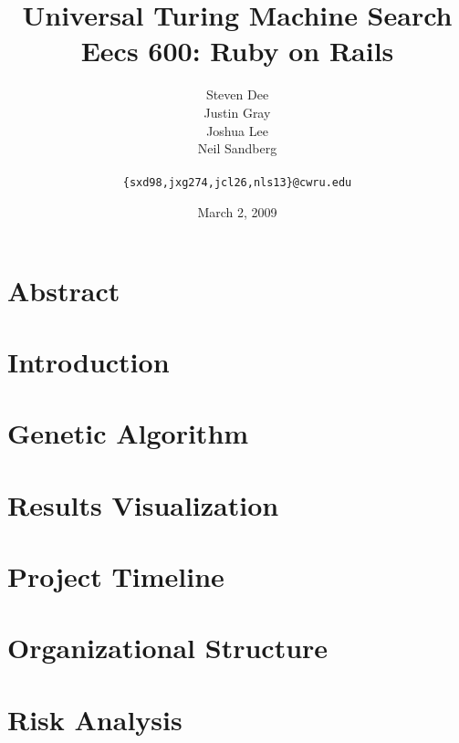 \documentclass{article}
\title{Universal Turing Machine Search\\
\Large {\sc Eecs} 600: Ruby on Rails}
\author{Steven Dee \\
Justin Gray \\
Joshua Lee \\
Neil Sandberg \\
 \\
\tt \{sxd98,jxg274,jcl26,nls13\}@cwru.edu}
\date{March 2, 2009}
\begin{document}
\maketitle

\section{Abstract}


\section{Introduction}


\section{Genetic Algorithm}


\section{Results Visualization}


\section{Project Timeline}


\section{Organizational Structure}


\section{Risk Analysis}




\end{document}
